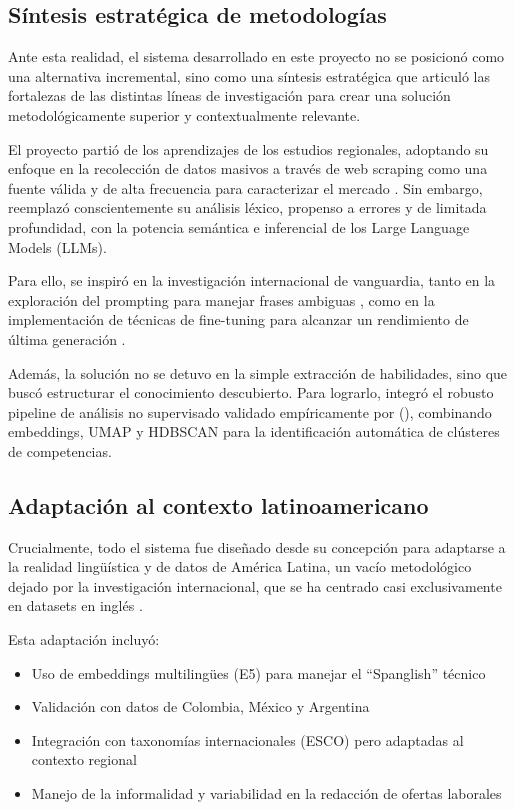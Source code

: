 \subsection{Síntesis estratégica de metodologías}

Ante esta realidad, el sistema desarrollado en este proyecto no se posicionó como una alternativa incremental, sino como una síntesis estratégica que articuló las fortalezas de las distintas líneas de investigación para crear una solución metodológicamente superior y contextualmente relevante.

El proyecto partió de los aprendizajes de los estudios regionales, adoptando su enfoque en la recolección de datos masivos a través de web scraping como una fuente válida y de alta frecuencia para caracterizar el mercado \parencite{aguilera2018, martinez2024, rubio2025}. Sin embargo, reemplazó conscientemente su análisis léxico, propenso a errores y de limitada profundidad, con la potencia semántica e inferencial de los Large Language Models (LLMs).

Para ello, se inspiró en la investigación internacional de vanguardia, tanto en la exploración del prompting para manejar frases ambiguas \parencite{nguyen2024}, como en la implementación de técnicas de fine-tuning para alcanzar un rendimiento de última generación \parencite{herandi2024}.

Además, la solución no se detuvo en la simple extracción de habilidades, sino que buscó estructurar el conocimiento descubierto. Para lograrlo, integró el robusto pipeline de análisis no supervisado validado empíricamente por \citeauthor{lukauskas2023} (\citeyear{lukauskas2023}), combinando embeddings, UMAP y HDBSCAN para la identificación automática de clústeres de competencias.

\subsection{Adaptación al contexto latinoamericano}

Crucialmente, todo el sistema fue diseñado desde su concepción para adaptarse a la realidad lingüística y de datos de América Latina, un vacío metodológico dejado por la investigación internacional, que se ha centrado casi exclusivamente en datasets en inglés \parencite{herandi2024}.

Esta adaptación incluyó:

\begin{itemize}
    \item Uso de embeddings multilingües (E5) para manejar el ``Spanglish'' técnico
    \item Validación con datos de Colombia, México y Argentina
    \item Integración con taxonomías internacionales (ESCO) pero adaptadas al contexto regional
    \item Manejo de la informalidad y variabilidad en la redacción de ofertas laborales
\end{itemize}

